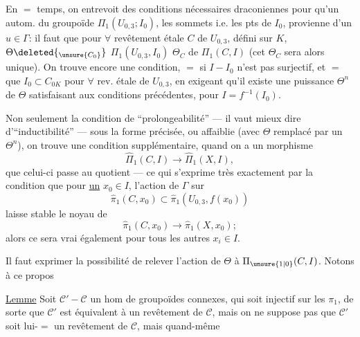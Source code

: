 En $=$ temps, on entrevoit des conditions nécessaires draconiennes pour qu'un autom. \inserted{$\Theta$} du groupoïde $\Pi_1(U_{0,3};I_0)$,   les sommets i.e. les pts de $I_0$, provienne d'un $u\in\Gamma$: il faut que pour $\forall$ revêtement  étale $C$ de $U_{0,3}$, défini sur $K$,      $\Theta\deleted{_{\unsure{C_0}}}$  $\Pi_1(U_{0,3},I_0)$   $\Theta_C$ de $\Pi_1(C,I)$     (cet $\Theta_C$ sera alors unique). On trouve encore une condition, $=$ si $I-I_0$ n'est pas surjectif, et   $=$ que $I_0\subset C_{0K}$ pour $\forall$ rev. étale de $U_{0,3}$, en exigeant qu'il existe une puissance $\Theta^n$ de $\Theta$  satisfaisant aux conditions précédentes, pour $I=f^{-1}(I_0)$.

Non seulement la condition de  ``prolongeabilité'' --- il vaut mieux dire d'``inductibilité'' --- sous la forme précisée, ou affaiblie (avec $\Theta$ remplacé par un $\Theta^n$), on trouve une condition supplémentaire, quand on a  un morphisme
\[
\widehat\Pi_1(C,I)\longrightarrow\widehat\Pi_1(X,I),
\]
que celui-ci passe au quotient --- ce qui s'exprime très exactement par la condition que pour \uline{un} $x_0\in I$, l'action de $\Gamma$ sur
\[
\widehat\pi_1(C,x_0)\subset\widehat\pi_1(U_{0,3},f(x_0))
\]
laisse stable le noyau de
\[
\widehat\pi_1(C,x_0)\longrightarrow\widehat\pi_1(X,x_0);
\]
alors ce sera vrai également pour tous les autres $x_i\in I$.

Il faut exprimer la possibilité de relever l'action de $\Theta$ à $\Pi_{\unsure{1|0}}(C,I)$. Notons à ce propos

\uline{Lemme} Soit $\mathcal C'-\mathcal C$ un hom de groupoïdes connexes, qui soit injectif sur les $\pi_1$,  de sorte que $\mathcal C'$ est équivalent à un revêtement de $\mathcal C$, mais on ne suppose pas que $\mathcal C'$ soit lui-$=$ un revêtement de $\mathcal C$, mais quand-même 

